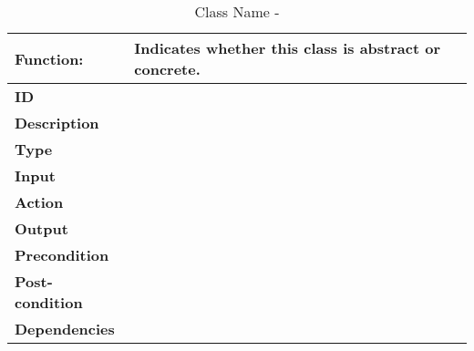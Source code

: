\documentclass[]{article}
\begin{document}
\FloatBarrier
\begin{table}[h]
\caption{Class Name - }
\label{tab:my-table}
\begin{tabular}{|p{}|p{}|}
\hline
\textbf{Function:} & Indicates whether this class is abstract or concrete.
\\ \hline
\textbf{ID}  &            

\\ \hline
\textbf{Description}    &                                                                     
\\ \hline
\textbf{Type}    &         

\\ \hline
\textbf{Input}        & 


\\ \hline
\textbf{Action}            & 

\\ \hline
\textbf{Output}            & 

\\ \hline
\textbf{Precondition}           &   

\\ \hline
\textbf{Post-condition}           & 


\\ \hline
\textbf{Dependencies}           & 
\\ \hline
\end{tabular}
\end{table}
\end{document}
